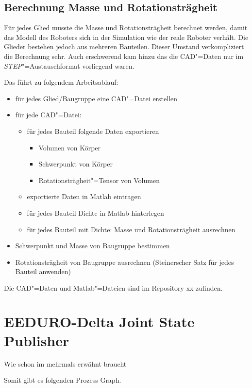 \subsection{Berechnung Masse und Rotationsträgheit}
Für jedes Glied musste die Masse und Rotationsträgheit berechnet werden, damit das Modell des Roboters sich in der Simulation wie der reale Roboter verhält.
Die Glieder bestehen jedoch aus mehreren Bauteilen.
Dieser Umstand verkompliziert die Berechnung sehr.
Auch erschwerend kam hinzu das die CAD"=Daten nur im \textit{STEP}"=Austauschformat vorliegend waren.

Das führt zu folgendem Arbeitsablauf:
\begin{itemize}
\item für jedes Glied/Baugruppe eine CAD"=Datei erstellen
\item für jede CAD"=Datei:
\begin{itemize}
\item für jedes Bauteil folgende Daten exportieren
\begin{itemize}
\item Volumen von Körper
\item Schwerpunkt von Körper
\item Rotationsträgheit"=Tensor von Volumen
\end{itemize}
\item exportierte Daten in Matlab eintragen
\item für jedes Bauteil Dichte in Matlab hinterlegen
\item für jedes Bauteil mit Dichte: Masse und Rotationsträgheit ausrechnen  
\end{itemize}
\item Schwerpunkt und Masse von Baugruppe bestimmen
\item Rotationsträgheit von Baugruppe ausrechnen (Steinerscher Satz für jedes Bauteil anwenden)
\end{itemize}

Die CAD"=Daten und Matlab"=Dateien sind im Repository xx zufinden.


\section{EEDURO-Delta Joint State Publisher}
Wie schon im mehrmals erwähnt braucht %




Somit gibt es folgenden Prozess Graph.



